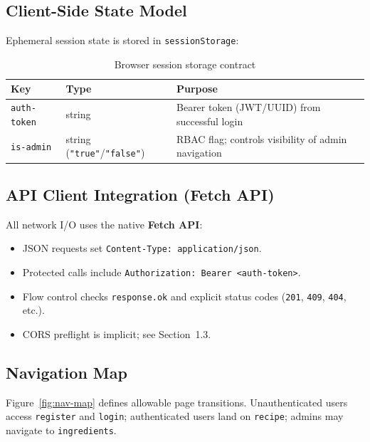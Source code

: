 \documentclass{article}
\begin{document}
\subsection{Client-Side State Model}
Ephemeral session state is stored in \texttt{sessionStorage}:
\begin{table}[htbp]
\centering
\footnotesize
\begin{tabular}{@{}llp{6.8cm}@{}}
\toprule
\textbf{Key} & \textbf{Type} & \textbf{Purpose} \\
\midrule
\texttt{auth-token} & string & Bearer token (JWT/UUID) from successful login \\
\texttt{is-admin} & string (\texttt{"true"}/\texttt{"false"}) & RBAC flag; controls visibility of admin navigation \\
\bottomrule
\end{tabular}
\caption{Browser session storage contract}
\label{tab:session-storage}
\end{table}

\subsection{API Client Integration (Fetch API)}
All network I/O uses the native \textbf{Fetch API}:
\begin{itemize}[noitemsep]
  \item JSON requests set \texttt{Content-Type: application/json}.
  \item Protected calls include \texttt{Authorization: Bearer <auth-token>}.
  \item Flow control checks \texttt{response.ok} and explicit status codes (\texttt{201}, \texttt{409}, \texttt{404}, etc.).
  \item CORS preflight is implicit; see Section~1.3.
\end{itemize}

\subsection{Navigation Map}
Figure~\ref{fig:nav-map} defines allowable page transitions. Unauthenticated users access \texttt{register} and \texttt{login}; authenticated users land on \texttt{recipe}; admins may navigate to \texttt{ingredients}.
\end{document}
